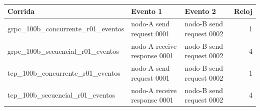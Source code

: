 \begin{tabular}{lllr}
\toprule
Corrida & Evento 1 & Evento 2 & Reloj \\
\midrule
grpc\_100b\_concurrente\_r01\_eventos & nodo-A send request 0001 & nodo-B send request 0002 & 1 \\
grpc\_100b\_secuencial\_r01\_eventos & nodo-A receive response 0001 & nodo-B send request 0002 & 4 \\
tcp\_100b\_concurrente\_r01\_eventos & nodo-A send request 0001 & nodo-B send request 0002 & 1 \\
tcp\_100b\_secuencial\_r01\_eventos & nodo-A receive response 0001 & nodo-B send request 0002 & 4 \\
\bottomrule
\end{tabular}
